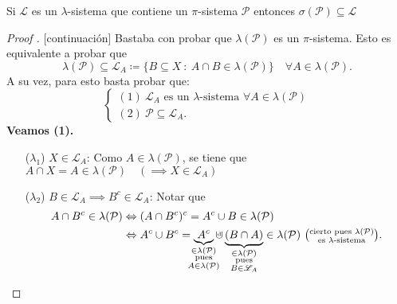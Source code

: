 \medskip
\begin{theorem}[Dynkin]
	Si $\mathscr{L}$ es un $\lambda$-sistema que contiene un $\pi$-sistema $\mathcal{P}$ entonces $\sigma(\mathcal{P}) \subseteq \mathscr{L}$
\end{theorem}
\begin{proof}[Proof ][continuación]
	Bastaba con probar que $\lambda{}(\mathcal{P})$ es un $\pi $-sistema. Esto es equivalente a probar que
	\[ \lambda(\mathcal{P}) \subseteq \mathscr{L}_A \coloneq \{B \subseteq X \ : \ A \cap B \in \lambda(\mathcal{P})\} \quad \forall A \in \lambda(\mathcal{P}). \]
	A su vez, para esto basta probar que:
	\[ \begin{cases}
		(1) \ \mathscr{L}_A \text{ es un } \lambda \text{-sistema } \forall A \in \lambda(\mathcal{P}) \\
		(2) \ \mathcal{P} \subseteq \mathscr{L}_A.
	\end{cases} \]
	\textbf{Veamos (1).}
	\begin{enumerate}
		\item[($\lambda_{1}$)] $X \in \mathscr{L}_A$: Como $A \in \lambda(\mathcal{P})$, se tiene que $A \cap X = A \in \lambda(\mathcal{P}) \quad (\implies X \in \mathscr{L}_A)$ \checkmark

		\item[($\lambda_{2}$)] $B \in \mathscr{L}_A \implies B^c \in \mathscr{L}_A$: Notar que
		\begin{align*}
			A \cap B^c \in \lambda(\mathcal{P}) & \iff (A \cap B^c)^c = A^c \cup B \in \lambda(\mathcal{P}) \\
			& \iff A^c \cup B^c = \underbrace{A^c}_{\mathclap{\substack{\in \lambda(\mathcal{P}) \\ \text{pues} \\ A \in \lambda(\mathcal{P})}}} \cupd \underbrace{(B \cap A)}_{\mathclap{\substack{\in \lambda(\mathcal{P}) \\ \text{pues} \\ B \in \mathscr{L}_A}}} \in \lambda(\mathcal{P}) \ \big(\substack{\text{cierto pues } \lambda(\mathcal{P}) \\ \text{es } \lambda \text{-sistema}}\big)
		.\end{align*}


\end{enumerate}
\end{proof}
